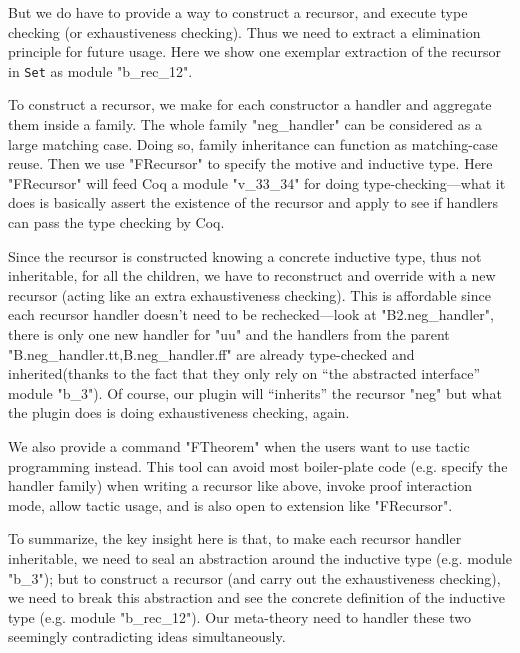 But we do have to provide a way to construct a recursor, and execute type checking (or exhaustiveness checking). Thus we need to extract a elimination principle for future usage. Here we show one exemplar extraction of the recursor in \texttt{Set} as module "b_rec_12".

To construct a recursor, we make for each constructor a handler and aggregate them inside a family. The whole family "neg_handler" can be considered as a large matching case. Doing so, family inheritance can function as matching-case reuse. Then we use "FRecursor" to specify the motive and inductive type. Here "FRecursor" will feed Coq
a module "v_33_34" for doing type-checking---what it does is basically assert the existence of the recursor and apply to see if handlers can pass the type checking by Coq. 

Since the recursor is constructed knowing a concrete inductive type, thus not inheritable, for all the children, we have to reconstruct and override with a new recursor (acting like an extra exhaustiveness checking). This is affordable since each recursor handler doesn't need to be rechecked---look at "B2.neg_handler", there is only one new handler for "uu" and the handlers from the parent "B.neg_handler.tt,B.neg_handler.ff" are already type-checked and inherited(thanks to the fact that they only rely on ``the abstracted interface'' module "b_3"). Of course, our plugin will ``inherits'' the recursor "neg" but what the plugin does is doing exhaustiveness checking, again.



We also provide a command "FTheorem" when the users want to use tactic programming instead. This tool can avoid most boiler-plate code (e.g. specify the handler family) when writing a recursor like above, invoke proof interaction mode, allow tactic usage, and is also open to extension like "FRecursor".

To summarize, the key insight here is that, to make each recursor handler inheritable, we need to seal an abstraction around the inductive type (e.g. module "b_3"); but to construct a recursor (and carry out the exhaustiveness checking), we need to break this abstraction and see the concrete definition of the inductive type (e.g. module "b_rec_12"). Our meta-theory need to handler these two seemingly contradicting ideas simultaneously. 


